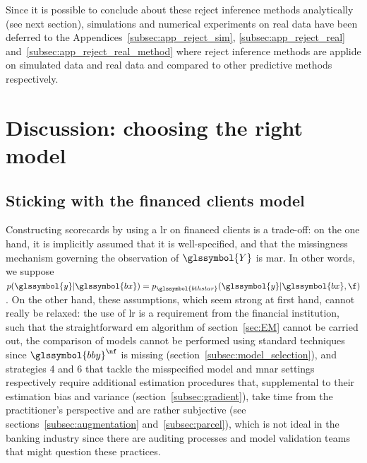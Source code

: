 \bigskip

Since it is possible to conclude about these reject inference methods analytically (see next section), simulations and numerical experiments on real data have been deferred to the Appendices~\ref{subsec:app_reject_sim}, \ref{subsec:app_reject_real} and~\ref{subsec:app_reject_real_method} where reject inference methods are applide on simulated data and real data and compared to other predictive methods respectively.


\section{Discussion: choosing the right model} \label{sec:conclusion_reject}

\subsection{Sticking with the financed clients model}

Constructing scorecards by using a \gls{lr} on financed clients is a trade-off: on the one hand, it is implicitly assumed that it is well-specified, and that the missingness mechanism governing the observation of $\glssymbol{Y}$ is \gls{mar}. In other words, we suppose $p(\glssymbol{y} | \glssymbol{bx}) = p_{\glssymbol{bthstar}}(\glssymbol{y} | \glssymbol{bx}, \f)$. On the other hand, these assumptions, which seem strong at first hand, cannot really be relaxed: the use of \gls{lr} is a requirement from the financial institution, such that the straightforward \gls{em} algorithm of section~\ref{sec:EM} cannot be carried out, the comparison of models cannot be performed using standard techniques since $\glssymbol{bby}^{\nf}$ is missing (section~\ref{subsec:model_selection}), and strategies 4 and 6 that tackle the misspecified model and \gls{mnar} settings respectively require additional estimation procedures that, supplemental to their estimation bias and variance (section~\ref{subsec:gradient}), take time from the practitioner's perspective and are rather subjective (see sections~\ref{subsec:augmentation} and~\ref{subsec:parcel}), which is not ideal in the banking industry since there are auditing processes and model validation teams that might question these practices.

